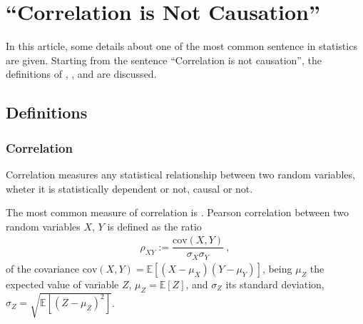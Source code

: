 \documentclass[letterpaper,10pt,english]{jupyterBook}
\begin{document}
\chapter{“Correlation is Not Causation”}
\label{\detokenize{code/notebooks/correlation_vs_causation:correlation-is-not-causation}}\label{\detokenize{code/notebooks/correlation_vs_causation::doc}}
\sphinxAtStartPar
In this article, some details about one of the most common sentence in statistics are given. Starting from the sentence “Correlation is not causation”, the definitions of , , and  are discussed.




\section{Definitions}
\label{\detokenize{code/notebooks/correlation_vs_causation:definitions}}



\subsection{Correlation}
\label{\detokenize{code/notebooks/correlation_vs_causation:correlation}}
\sphinxAtStartPar
Correlation measures any statistical relationship between two random variables, wheter it is statistically dependent or not, causal or not.

\sphinxAtStartPar
The most common measure of correlation is . Pearson correlation between two random variables \(X\), \(Y\) is defined as the ratio
\begin{equation*}
\begin{split}\rho_{XY} := \dfrac{\text{cov}(X,Y)}{\sigma_X \sigma_Y} \ ,\end{split}
\end{equation*}
\sphinxAtStartPar
of the covariance \(\text{cov}(X,Y) = \mathbb{E}\left[ (X-\mu_X) (Y-\mu_Y) \right]\), being \(\mu_Z\) the expected value of variable \(Z\), \(\mu_Z = \mathbb{E}\left[ Z \right]\), and \(\sigma_{Z}\) its standard deviation, \(\sigma_{Z} = \sqrt{\mathbb{E}\left[ \left( Z - \mu_Z \right)^2 \right]}\).
\end{document}
